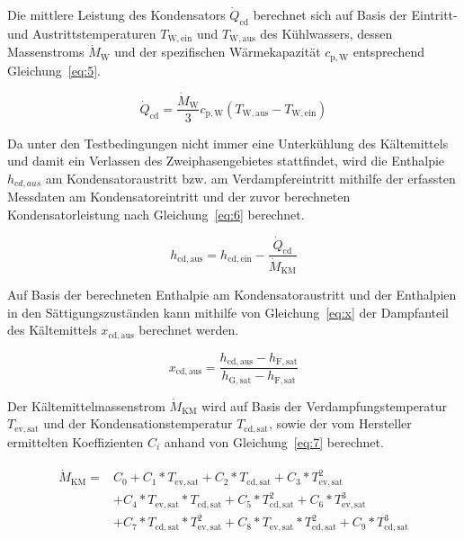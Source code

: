Die mittlere Leistung des Kondensators $\dot{Q}_{\mathrm{cd}}$ berechnet sich auf Basis der Eintritt- und Austrittstemperaturen $T_\mathrm{W,ein}$ und $T_\mathrm{W,aus}$ des Kühlwassers, dessen Massenstroms $\dot{M}_\mathrm{W}$ und der spezifischen Wärmekapazität $c_{\mathrm{p,W}}$ entsprechend Gleichung~\ref{eq:5}.

\begin{equation}
\label{eq:5}
\dot{Q}_{\mathrm{cd}}= \frac{\dot{M}_{\mathrm{W}}}{3} c_{\mathrm{p,W}} (T_{\mathrm{W,aus}} - T_{\mathrm{W,ein}})
\end{equation}

Da unter den Testbedingungen nicht immer eine Unterkühlung des Kältemittels und damit ein Verlassen des Zweiphasengebietes stattfindet, wird die Enthalpie $h_{cd,aus}$ am Kondensatoraustritt bzw. am Verdampfereintritt mithilfe der erfassten Messdaten am Kondensatoreintritt und der zuvor berechneten Kondensatorleistung nach Gleichung~\ref{eq:6} berechnet.

\begin{equation}
\label{eq:6}
h_{\mathrm{cd,aus}} = h_{\mathrm{cd,ein}} - \frac{\dot{Q}_{\mathrm{cd}}}{\dot{M}_{\mathrm{KM}}}
\end{equation}

Auf Basis der berechneten Enthalpie am Kondensatoraustritt und der Enthalpien in den Sättigungszuständen kann mithilfe von Gleichung~\ref{eq:x} der Dampfanteil des Kältemittels $x_{\mathrm{cd,aus}}$ berechnet werden.

\begin{equation}
\label{eq:x}
x_{\mathrm{cd,aus}} = \frac{h_{\mathrm{cd,aus}}-h_{\mathrm{F,sat}}}{h_{\mathrm{G,sat}}-h_{\mathrm{F,sat}}}
\end{equation}


Der Kältemittelmassenstrom $\dot{M}_{\mathrm{KM}}$ wird auf Basis der Verdampfungstemperatur $T_{\mathrm{ev,sat}}$  und der Kondensationstemperatur $T_{\mathrm{cd,sat}}$, sowie der vom Hersteller ermittelten Koeffizienten $C_i$ anhand von Gleichung~\ref{eq:7} berechnet.

\begin{align}
\label{eq:7}
	\begin{split}
	\dot{M}_{\mathrm{KM}} = &C_0 + C_1*T_{\mathrm{ev,sat}} + C_2*T_{\mathrm{cd,sat}} + C_3*T_{\mathrm{ev,sat}}^2 \\
	&+C_4*T_{\mathrm{ev,sat}}*T_{\mathrm{cd,sat}} + C_5*T_{\mathrm{cd,sat}}^2 + C_6*T_{\mathrm{ev,sat}}^3 \\
	&+ C_7*T_{\mathrm{cd,sat}}*T_{\mathrm{ev,sat}}^2 +C_8*T_{\mathrm{ev,sat}}*T_{\mathrm{cd,sat}}^2 + C_9*T_{\mathrm{cd,sat}}^3
	\end{split}
\end{align}

